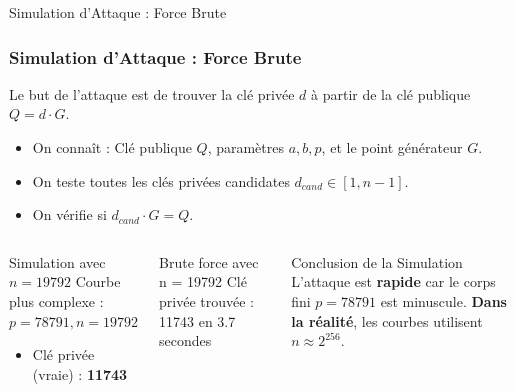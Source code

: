 \begin{frame}{Simulation d'Attaque : Force Brute}
\frametitle{Simulation d'Attaque : Force Brute}

Le but de l'attaque est de trouver la clé privée $d$ à partir de la clé publique $Q=d \cdot G$.

\begin{itemize}
    \item On connaît : Clé publique $Q$, paramètres $a, b, p$, et le point générateur $G$.
    \item On teste toutes les clés privées candidates $d_{cand} \in [1, n-1]$.
    \item On vérifie si $d_{cand} \cdot G = Q$.
\end{itemize}

\begin{columns}
    \begin{exampleblock}{Simulation avec $n=19792$}
        Courbe plus complexe : $p=78791, n=19792$
        \begin{itemize}
            \item Clé privée (vraie) : \textbf{11743}
        \end{itemize}
    \end{exampleblock}
    
    \begin{alertblock}{Brute force avec n = 19792}
	Clé privée trouvée : 11743 en 3.7 secondes
	\end{alertblock}

    \begin{alertblock}{Conclusion de la Simulation}
        L'attaque est \textbf{rapide} car le corps fini $p=78791$ est minuscule.
        \textbf{Dans la réalité}, les courbes utilisent $n \approx 2^{256}$.
    \end{alertblock}
\end{columns}
\end{frame}

